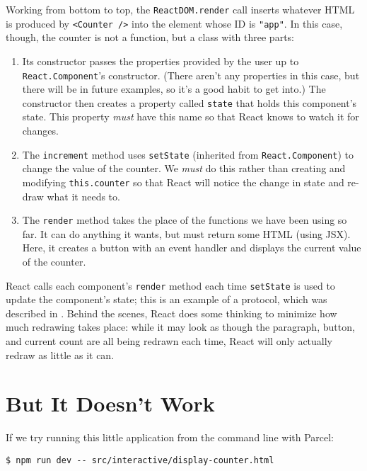 Working from bottom to top,
the \texttt{ReactDOM.render} call inserts whatever HTML is produced by \texttt{\textless{}Counter\ /\textgreater{}}
into the element whose ID is \texttt{"app"}.
In this case,
though,
the counter is not a function,
but a class with three parts:

\begin{enumerate}
\item
  Its constructor passes the properties provided by the user up to \texttt{React.Component}'s constructor.
  (There aren't any properties in this case,
  but there will be in future examples,
  so it's a good habit to get into.)
  The constructor then creates a property called \texttt{state}
  that holds this component's state.
  This property \emph{must} have this name so that React knows to watch it for changes.
\item
  The \texttt{increment} method uses \texttt{setState} (inherited from \texttt{React.Component})
  to change the value of the counter.
  We \emph{must} do this rather than creating and modifying \texttt{this.counter}
  so that React will notice the change in state
  and re-draw what it needs to.
\item
  The \texttt{render} method takes the place of the functions we have been using so far.
  It can do anything it wants, but must return some HTML (using JSX).
  Here, it creates a button with an event handler and displays the current value of the counter.
\end{enumerate}

React calls each component's \texttt{render} method each time \texttt{setState} is used to update the component's state;
this is an example of a protocol,
which was described in .
Behind the scenes,
React does some thinking to minimize how much redrawing takes place:
while it may look as though the paragraph, button, and current count are all being redrawn each time,
React will only actually redraw as little as it can.

\section{But It Doesn't Work}\label{s:interactive-babel}

If we try running this little application from the command line with Parcel:

\begin{verbatim}
$ npm run dev -- src/interactive/display-counter.html
\end{verbatim}

